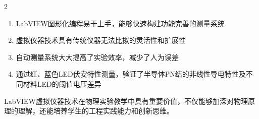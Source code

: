 \documentclass[12pt,a4paper]{article}
\begin{document}
\begin{multicols}{2}
    \begin{enumerate}
        \item LabVIEW图形化编程易于上手，能够快速构建功能完善的测量系统
        \item 虚拟仪器技术具有传统仪器无法比拟的灵活性和扩展性
        \item 自动测量系统大大提高了实验效率，减少了人为误差
        \item 通过红、蓝色LED伏安特性测量，验证了半导体PN结的非线性导电特性及不同材料LED的阈值电压差异
    \end{enumerate}

    LabVIEW虚拟仪器技术在物理实验教学中具有重要价值，不仅能够加深对物理原理的理解，还能培养学生的工程实践能力和创新思维。

\end{multicols}
\end{document}
